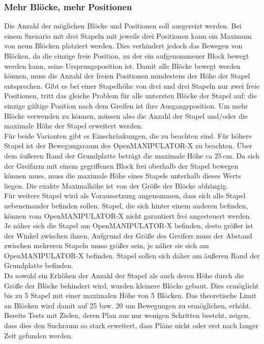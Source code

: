 \subsubsection{Mehr Blöcke, mehr Positionen}
Die Anzahl der möglichen Blöcke und Positionen soll ausgereizt werden.
Bei einem Szenario mit drei Stapeln mit jeweils drei Positionen kann ein Maximum von neun Blöcken platziert werden.
Dies verhindert jedoch das Bewegen von Blöcken, da die einzige freie Position, zu der ein aufgenommener Block bewegt werden kann, seine Ursprungsposition ist.
Damit alle Blöcke bewegt werden können, muss die Anzahl der freien Positionen mindestens der Höhe der Stapel entsprechen.
Gibt es bei einer Stapelhöhe von drei und drei Stapeln nur zwei freie Positionen, tritt das gleiche Problem für alle untersten Blöcke der Stapel auf: die einzige gültige Position nach dem Greifen ist ihre Ausgangsposition.
Um mehr Blöcke verwenden zu können, müssen also die Anzahl der Stapel und/oder die maximale Höhe der Stapel erweitert werden.\\
Für beide Varianten gibt es Einschränkungen, die zu beachten sind.
Für höhere Stapel ist der Bewegungsraum des OpenMANIPULATOR-X zu beachten.
Über dem äußeren Rand der Grundplatte beträgt die maximale Höhe ca 25\,cm.
Da sich der Greifarm mit einem gegriffenen Block frei oberhalb der Stapel bewegen können muss, muss die maximale Höhe eines Stapels unterhalb dieses Werts liegen.
Die exakte Maximalhöhe ist von der Größe der Blöcke abhängig.\\
Für weitere Stapel wird als Voraussetzung angenommen, dass sich alle Stapel nebeneinander befinden sollen.
Stapel, die sich hinter einem anderen befinden, können vom OpenMANIPULATOR-X nicht garantiert frei angesteuert werden.
Je näher sich die Stapel am OpenMANIPULATOR-X befinden, desto größer ist der Winkel zwischen ihnen.
Aufgrund der Größe des Greifers muss der Abstand zwischen mehreren Stapeln umso größer sein, je näher sie sich am OpenMANIPULATOR-X befinden.
Stapel sollen sich daher am äußeren Rand der Grundplatte befinden.\\
Da sowohl ein Erhöhen der Anzahl der Stapel als auch deren Höhe durch die Größe der Blöcke behindert wird, wurden kleinere Blöcke gebaut.
Dies ermöglicht bis zu 5 Stapel mit einer maximalen Höhe von 5 Blöcken.
Das theoretische Limit an Blöcken wird damit auf 25 bzw. 20 um Bewegungen zu ermöglichen, erhöht.\\
Bereits Tests mit Zielen, deren Plan aus nur wenigen Schritten besteht, zeigen, dass dies den Suchraum so stark erweitert, dass Pläne nicht oder erst nach langer Zeit gefunden werden.
